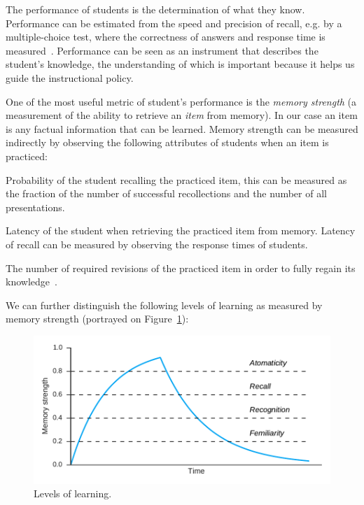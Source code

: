 The performance of students is the determination of what they know. Performance can be estimated from the speed and precision of recall, e.g. by a multiple-choice test, where the correctness of answers and response time is measured~\cite{Lewis}. Performance can be seen as an instrument that describes the student's knowledge, the understanding of which is important because it helps us guide the instructional policy.

One of the most useful metric of student's performance is the \textit{memory strength} (a measurement of the ability to retrieve an \textit{item} from memory). In our case an item is any factual information that can be learned. Memory strength can be measured indirectly by observing the following attributes of students when an item is practiced:

\begin{description}[leftmargin=0cm]
  \item[Probability of recall] Probability of the student recalling the practiced item, this can be measured as the fraction of the number of successful recollections and the number of all presentations.
  \item[Latency of recall] Latency of the student when retrieving the practiced item from memory. Latency of recall can be measured by observing the response times of students.
  \item[Savings in relearning] The number of required revisions of the practiced item in order to fully regain its knowledge~\cite{MichaelW.Eysenck2008}.
\end{description}

We can further distinguish the following levels of learning as measured by memory strength (portrayed on Figure~\ref{fig:knowledge-levels}):

\begin{figure}[htbp]
  \centering
  \includegraphics[width=\textwidth]{img/knowledge-levels}
  \caption{Levels of learning.}
  \label{fig:knowledge-levels}
\end{figure}

